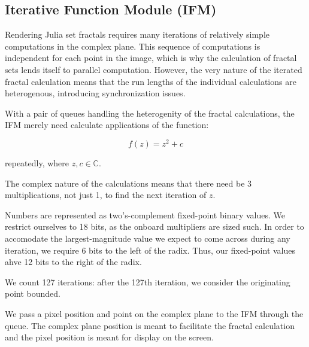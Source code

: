 \documentclass{article}
\begin{document}
\subsection{Iterative Function Module (IFM)}

Rendering Julia set fractals requires many iterations of relatively
simple computations in the complex plane. This sequence of
computations is independent for each point in the image, which is why
the calculation of fractal sets lends itself to parallel
computation. However, the very nature of the iterated fractal
calculation means that the run lengths of the individual calculations
are heterogenous, introducing synchronization issues.

With a pair of queues handling the heterogenity of the fractal
calculations, the IFM merely need calculate applications of the function:

\begin{equation}
f(z) = z^2 + c
\end{equation}

repeatedly, where $z,c \in \mathbb{C}$.

The complex nature of the calculations means that there need be 3
multiplications, not just 1, to find the next iteration of $z$.

Numbers are represented as two's-complement fixed-point binary
values. We restrict ourselves to 18 bits, as the onboard multipliers
are sized such. In order to accomodate the largest-magnitude value we
expect to come across during any iteration, we require 6 bits to the
left of the radix. Thus, our fixed-point values ahve 12 bits to the
right of the radix.

We count 127 iterations: after the 127th iteration, we consider the
originating point bounded.

We pass a pixel position and point on the complex plane to the IFM
through the queue. The complex plane position is meant to
facilitate the fractal calculation and the pixel position is meant for
display on the screen.

\end{document}
